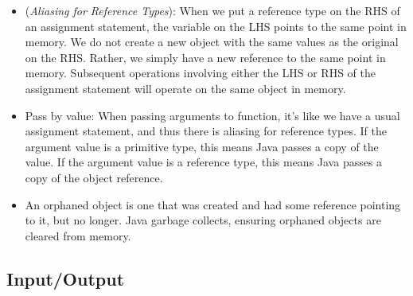 \documentclass[12pt]{article}
\theoremstyle{plain}
\theoremstyle{definition}
\theoremstyle{remark}
\begin{document}
\begin{itemize}
\begin{lstlisting}
      // Constructor
      public Charge(double x0, double y0, double q0)
      {
        rx = x0;
        ry = y0;
        q  = q0;
      }

      // Methods
      public double potentialAt(double x, double y)
      {
        double k  = 8.99e09;
        double dx = x - rx;
        double dy = y - ry;
        return k * q / Math.sqrt(dx*dx + dy*dy);
      }

      public String toString()
      {
        return q + " at " + "(" + rx + ", " + ry + ")";
      }

      // Test client
      public static void main(String[] args)
      {
        Charge c = new Charge(.72, .31, 21.3);
        StdOut.println(c);
        StdOut.printf("%6.2e\n", c.potentialAt(.42, .71));
      }
    }
    \end{lstlisting}



  \item
    (\emph{Aliasing for Reference Types}):
    When we put a reference type on the RHS of an assignment statement,
    the variable on the LHS points to the same point in memory.
    We do not create a new object with the same values as the original
    on the RHS.
    Rather, we simply have a new reference to the same point in memory.
    Subsequent operations involving either the LHS or RHS of the
    assignment statement will operate on the same object in memory.

  \item Pass by value:
    When passing arguments to function, it's like we have a usual
    assignment statement, and thus there is aliasing for reference
    types.
    If the argument value is a primitive type, this means Java passes a
    copy of the value.
    If the argument value is a reference type, this means Java passes a
    copy of the object reference.

  \item An orphaned object is one that was created and had some
    reference pointing to it, but no longer.
    Java garbage collects, ensuring orphaned objects are
    cleared from memory.


\end{itemize}




\clearpage
\subsection{Input/Output}
\end{document}
